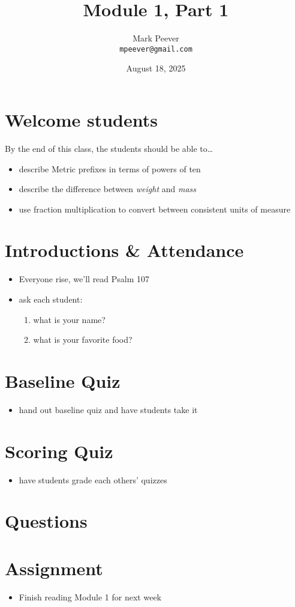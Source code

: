 \documentclass[10pt, oneside]{article}   	%
\title{Module 1, Part 1}
\author{Mark Peever\\ \texttt{mpeever@gmail.com}}
\date{August 18, 2025}
\begin{document}
\maketitle

\section*{Welcome students}
By the end of this class, the students should be able to\ldots
\begin{itemize}
\item describe Metric prefixes in terms of powers of ten
\item describe the difference between \emph{weight} and \emph{mass}
\item use fraction multiplication to convert between consistent units of measure
\end{itemize}

\section*{Introductions \& Attendance}
\begin{itemize}
\item Everyone rise, we'll read Psalm 107
\item ask each student:
\begin{enumerate}
\item what is your name?
\item what is your favorite food?
\end{enumerate}
\end{itemize}

\section*{Baseline Quiz}
\begin{itemize}
\item hand out baseline quiz and have students take it 
\end{itemize}

\section*{Scoring Quiz}
\begin{itemize}
\item have students grade each others' quizzes
\end{itemize}

\section*{Questions}

\section*{Assignment}
\begin{itemize}
\item Finish reading Module 1 for next week
\end{itemize}
\end{document}
